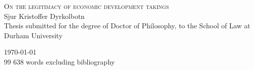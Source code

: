 \begin{titlepage}

\begin{center}



\vspace*{\fill}
\centering

{\Huge\textsc{On the legitimacy of economic development takings}}\\[3cm]


{\large Sjur Kristoffer Dyrkolbotn}\\

\large {Thesis submitted for the degree of Doctor of Philosophy, to the School of Law at Durham University} \\

\vspace*{\fill}

 

\vfill

{\Large \today}\\
{99 638 words excluding bibliography}

\end{center}

\end{titlepage}
